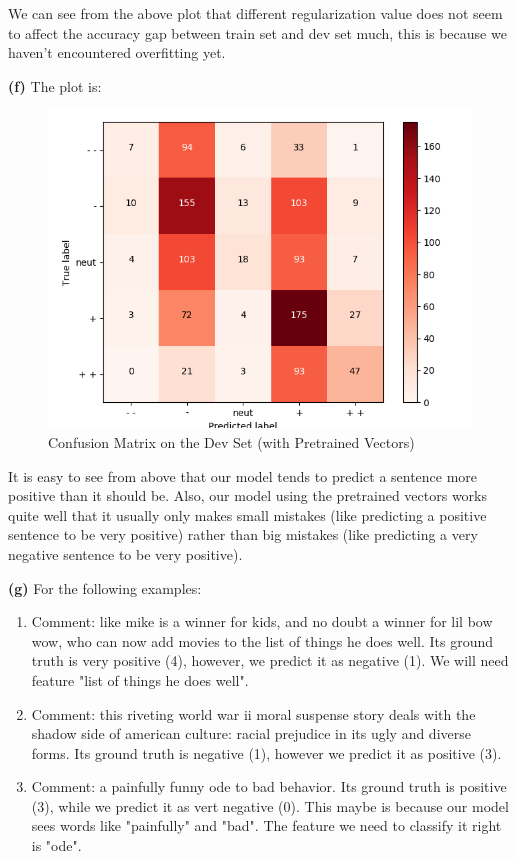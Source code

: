 \documentclass[10pt, a4paper]{ctexart}
\begin{document}
We can see from the above plot that different regularization value does not seem to affect the accuracy gap between train set and dev set much, this is because we haven't encountered overfitting yet.\par
{\bf{(f)}} The plot is:
\begin{figure}[H]
    \centering
    \includegraphics[width=0.7\linewidth]{../q4_dev_conf.png}
    \caption{Confusion Matrix on the Dev Set (with Pretrained Vectors)}
\end{figure}\par
It is easy to see from above that our model tends to predict a sentence more positive than it should be. Also, our model using the pretrained vectors works quite well that it usually only makes small mistakes (like predicting a positive sentence to be very positive) rather than big mistakes (like predicting a very negative sentence to be very positive).\par
{\bf{(g)}} For the following examples:
\begin{enumerate}
    \item Comment: like mike is a winner for kids, and no doubt a winner for lil bow wow, who can now add movies to the list of things he does well. Its ground truth is very positive (4), however, we predict it as negative (1). We will need feature "list of things he does well".
    \item Comment: this riveting world war ii moral suspense story deals with the shadow side of american culture: racial prejudice in its ugly and diverse forms. Its ground truth is negative (1), however we predict it as positive (3).
    \item Comment: a painfully funny ode to bad behavior. Its ground truth is positive (3), while we predict it as vert negative (0). This maybe is because our model sees words like "painfully" and "bad". The feature we need to classify it right is "ode".
\end{enumerate}
\end{document}
